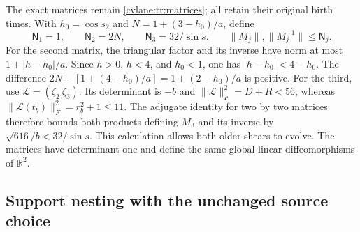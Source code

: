 The exact matrices remain \eqref{cvlane:tr:matrices}; all retain their
original birth times. With $h_0=\cos s_2$ and
$N=1+(3-h_0)/a$, define
\begin{equation}\label{cvlane:trls:matrixbounds}
 \mathsf N_1=1,\qquad \mathsf N_2=2N,\qquad
 \mathsf N_3=32/\sin s.
 \qquad
 \|M_j\|,\|M_j^{-1}\|\leq\mathsf N_j.
\end{equation}
For the second matrix, the triangular factor and its inverse have
norm at most $1+|h-h_0|/a$. Since $h>0$, $h<4$, and
$h_0<1$, one has $|h-h_0|<4-h_0$. The difference
$2N-[1+(4-h_0)/a]=1+(2-h_0)/a$ is positive.
For the third, use $\mathcal L=(\zeta_2\ \zeta_3)$.
Its determinant is $-b$ and
$\|\mathcal L\|_F^2=D+R<56$, whereas
$\|\mathcal L(t_b)\|_F^2=r_b^2+1\leq11$.
The adjugate identity for two by two matrices therefore bounds
both products defining $M_3$ and its inverse by
$\sqrt{616}/b<32/\sin s$. This calculation allows both
older shears to evolve. The matrices have determinant one and
define the same global linear diffeomorphisms of $\mathbb R^2$.

\subsection{Support nesting with the unchanged source choice}

